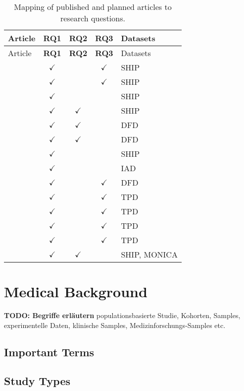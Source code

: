 \documentclass[
]{book}
\begin{document}
\begin{longtable}[]{@{}lcccl@{}}
\caption{\label{tab:mapping} Mapping of published and planned articles to research questions.}\tabularnewline
\toprule
Article & \textbf{RQ1} & \textbf{RQ2} & \textbf{RQ3} & Datasets\tabularnewline
\midrule
\endfirsthead
\toprule
Article & \textbf{RQ1} & \textbf{RQ2} & \textbf{RQ3} & Datasets\tabularnewline
\midrule
\endhead
\autocite{Niemann:ESWA2014} & \(\checkmark\) & & \(\checkmark\) & SHIP\tabularnewline
\autocite{Niemann:IMM2014} & \(\checkmark\) & & \(\checkmark\) & SHIP\tabularnewline
\autocite{NiemannEtAl:FCDS2014} & \(\checkmark\) & & & SHIP\tabularnewline
\autocite{Niemann:CBMS2015} & \(\checkmark\) & \(\checkmark\) & & SHIP\tabularnewline
\autocite{Niemann:CBMS2016} & \(\checkmark\) & \(\checkmark\) & & DFD\tabularnewline
\autocite{Niemann:PONE2016} & \(\checkmark\) & \(\checkmark\) & & DFD\tabularnewline
\autocite{Niemann:CBMS2017} & \(\checkmark\) & & & SHIP\tabularnewline
\autocite{Niemann:CBMS2018} & \(\checkmark\) & & & IAD\tabularnewline
\autocite{Niemann:EBioMedicine2020} & \(\checkmark\) & & \(\checkmark\) & DFD\tabularnewline
\autocite{Niemann:SREP2020} & \(\checkmark\) & & \(\checkmark\) & TPD\tabularnewline
\autocite{Niemann:PONE2020} & \(\checkmark\) & & \(\checkmark\) & TPD\tabularnewline
\autocite{Niemann:Frontiers2020} & \(\checkmark\) & & \(\checkmark\) & TPD\tabularnewline
\autocite{Niemann:Pheno2020} & \(\checkmark\) & & \(\checkmark\) & TPD\tabularnewline
\autocite{Niemann:SciRep2020} & \(\checkmark\) & \(\checkmark\) & & SHIP, MONICA\tabularnewline
\bottomrule
\end{longtable}

\hypertarget{medical-background}{%
\chapter{Medical Background}\label{medical-background}}

\textbf{TODO: Begriffe erläutern} populationsbasierte Studie, Kohorten, Samples, experimentelle Daten, klinische Samples, Medizinforschungs-Samples etc.

\hypertarget{important-terms}{%
\section{Important Terms}\label{important-terms}}

\hypertarget{study-types}{%
\section{Study Types}\label{study-types}}
\end{document}
